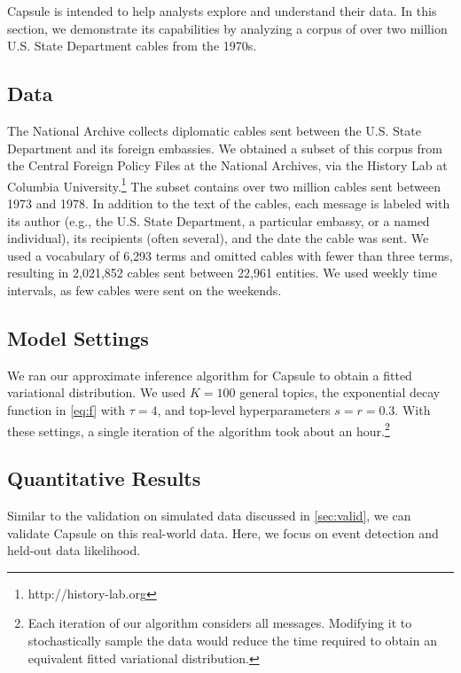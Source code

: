 Capsule is intended to help analysts explore and understand their
data. In this section, we demonstrate its capabilities by analyzing a
corpus of over two million U.S. State Department cables from the
1970s.

\subsection{Data}

The National Archive collects diplomatic cables sent between the
U.S. State Department and its foreign embassies. We obtained a subset
of this corpus from the Central Foreign Policy Files at the National
Archives, via the History Lab at Columbia
University.\footnote{http://history-lab.org} The subset contains over
two million cables sent between 1973 and 1978. In addition to the text
of the cables, each message is labeled with its author (e.g., the
U.S. State Department, a particular embassy, or a named individual),
its recipients (often several), and the date the cable was sent. We
used a vocabulary of 6,293 terms and omitted cables with fewer than
three terms, resulting in 2,021,852 cables sent between 22,961
entities. We used weekly time intervals, as few cables were sent on
the weekends.

\subsection{Model Settings}


We ran our approximate inference algorithm for Capsule to obtain a
fitted variational distribution. We used $K=100$ general topics, the
exponential decay function in \cref{eq:f} with $\tau=4$, and top-level
hyperparameters $s=r=0.3$. With these settings, a single iteration of
the algorithm took about an hour.\footnote{Each iteration of our
  algorithm considers all messages. Modifying it to stochastically
  sample the data would reduce the time required to obtain an
  equivalent fitted variational distribution.}

\subsection{Quantitative Results}

Similar to the validation on simulated data discussed in \cref{sec:valid}, 
we can validate Capsule on this real-world data.  Here, we focus on event detection
and held-out data likelihood.

